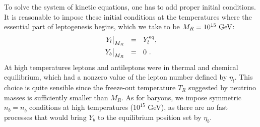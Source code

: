 \documentclass[12pt]{revtex4}
\newcommand{\GeV}{{\rm GeV}}
\begin{document}
To solve the system of kinetic equations, one has to add proper initial conditions.
	It is reasonable to impose these initial conditions at the temperatures
	where the essential part of leptogenesis begins, which we
	take to be $ M_R = 10^{15}~\GeV $:
	\begin{eqnarray}
	Y_l\bigl|_{M_R} & ~~=~~ Y_l^{\rm eq}, \\
	Y_b\bigl|_{M_R} & ~~=~~ 0~. \nonumber
\end{eqnarray}
	At high temperatures leptons and antileptons were in thermal and chemical equilibrium, which
	had a nonzero value of the lepton number defined by $ \eta_l $.
	This choice is quite sensible since 
	the freeze-out temperature $ T_R $ suggested by neutrino masses 
    is sufficiently smaller than $ M_R $.
	As for baryons, we impose symmetric $n_b=n_{\bar b}$ conditions 
	at high temperatures ($10^{15}$ GeV), as there are no fast processes that would bring 
$Y_b$ to the equilibrium position set by  $\eta_b$.
\end{document}
